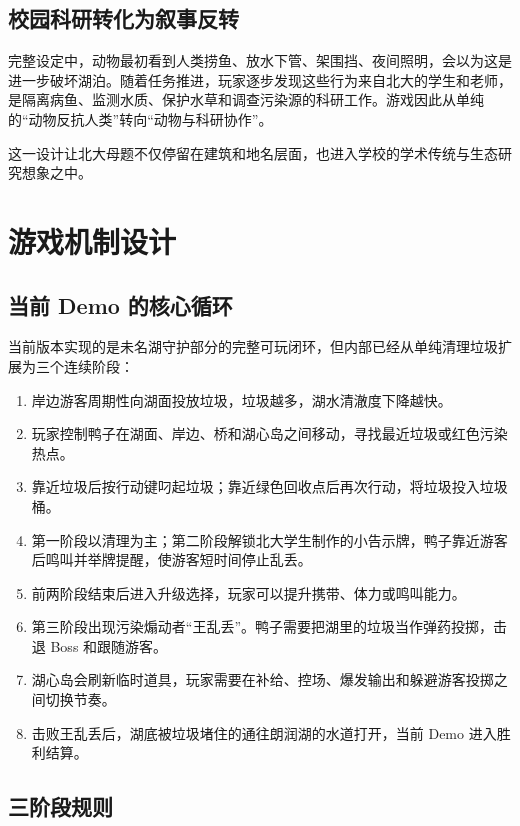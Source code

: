 \documentclass[UTF8,a4paper,12pt]{ctexart}
\begin{document}
\subsection{校园科研转化为叙事反转}

完整设定中，动物最初看到人类捞鱼、放水下管、架围挡、夜间照明，会以为这是进一步破坏湖泊。随着任务推进，玩家逐步发现这些行为来自北大的学生和老师，是隔离病鱼、监测水质、保护水草和调查污染源的科研工作。游戏因此从单纯的``动物反抗人类''转向``动物与科研协作''。

这一设计让北大母题不仅停留在建筑和地名层面，也进入学校的学术传统与生态研究想象之中。

\section{游戏机制设计}

\subsection{当前 Demo 的核心循环}

当前版本实现的是未名湖守护部分的完整可玩闭环，但内部已经从单纯清理垃圾扩展为三个连续阶段：

\begin{enumerate}
  \item 岸边游客周期性向湖面投放垃圾，垃圾越多，湖水清澈度下降越快。
  \item 玩家控制鸭子在湖面、岸边、桥和湖心岛之间移动，寻找最近垃圾或红色污染热点。
  \item 靠近垃圾后按行动键叼起垃圾；靠近绿色回收点后再次行动，将垃圾投入垃圾桶。
  \item 第一阶段以清理为主；第二阶段解锁北大学生制作的小告示牌，鸭子靠近游客后鸣叫并举牌提醒，使游客短时间停止乱丢。
  \item 前两阶段结束后进入升级选择，玩家可以提升携带、体力或鸣叫能力。
  \item 第三阶段出现污染煽动者``王乱丢''。鸭子需要把湖里的垃圾当作弹药投掷，击退 Boss 和跟随游客。
  \item 湖心岛会刷新临时道具，玩家需要在补给、控场、爆发输出和躲避游客投掷之间切换节奏。
  \item 击败王乱丢后，湖底被垃圾堵住的通往朗润湖的水道打开，当前 Demo 进入胜利结算。
\end{enumerate}

\subsection{三阶段规则}
\end{document}
